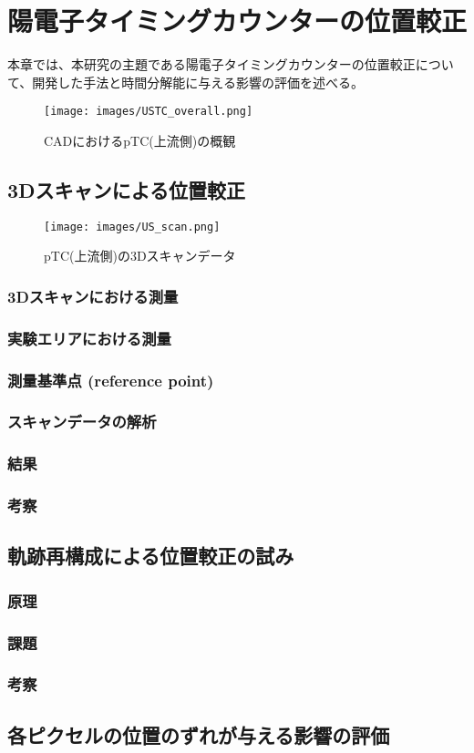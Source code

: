 \documentclass[Yonemoto_master.tex]{subfiles}
\begin{document}
\chapter{陽電子タイミングカウンターの位置較正}
本章では、本研究の主題である陽電子タイミングカウンターの位置較正について、開発した手法と時間分解能に与える影響の評価を述べる。

\begin{figure}[h]
\begin{center}
\texttt{[image: images/USTC\_overall.png]}
\caption{CADにおけるpTC(上流側)の概観}
\end{center}
\end{figure}

\section{3Dスキャンによる位置較正}
\begin{figure}[h]
\begin{center}
\texttt{[image: images/US\_scan.png]}
\caption{pTC(上流側)の3Dスキャンデータ}
\end{center}
\end{figure}


\subsection{3Dスキャンにおける測量}
\subsection{実験エリアにおける測量}
\subsection{測量基準点 (reference point)}
\subsection{スキャンデータの解析}
\subsection{結果}
\subsection{考察}

\section{軌跡再構成による位置較正の試み}
\subsection{原理}
\subsection{課題}
\subsection{考察}

\section{各ピクセルの位置のずれが与える影響の評価}
\end{document}
